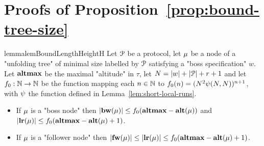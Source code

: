 \section{Proofs of Proposition~\ref{prop:bound-tree-size}}
\label{app:bound-tree-size}

\begin{restatable}{lemma}{lemBoundLengthHeightH}
	\label{lem:bound-length-at-height-h}
	Let $\mathcal{P}$ be a protocol, let $\mu$ be a node of a "unfolding tree" of minimal size labelled by $\mathcal{P}$ satisfying a "boss specification" $w$.
	Let $\mathbf{altmax}$ be the maximal "altitude" in $\tau$, let $N = |w| + |\mathcal{P}| +r +1$ and let $f_0 : \mathbb{N} \to \mathbb{N}$ be the function mapping each $n \in \mathbb{N}$ to $f_0(n)=(N^2 \psi(N,N))^{n+1}$, with $\psi$ the function defined in Lemma~\ref{lem:short-local-runs}.
	
	\begin{itemize}
		\item If $\mu$ is a "boss node" then $|\mathbf{bw}(\mu)| \leq f_0(\mathbf{altmax} - \mathbf{alt}(\mu))$ and $|\mathbf{lr}(\mu)| \leq f_0(\mathbf{altmax} - \mathbf{alt}(\mu)+1)$.
		
		\item If $\mu$ is a "follower node" then $|\mathbf{fw}(\mu)| \leq |\mathbf{lr}(\mu)| \leq f_0(\mathbf{altmax} - \mathbf{alt}(\mu)+1)$.
	\end{itemize} 
\end{restatable}

